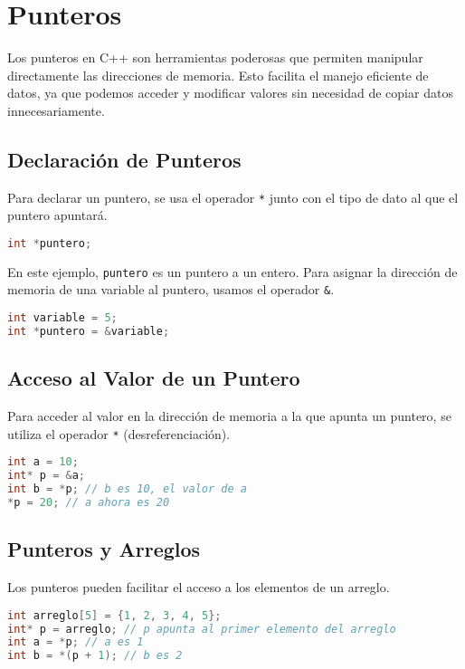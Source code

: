 \section{Punteros}

Los punteros en C++ son herramientas poderosas que permiten manipular directamente las direcciones de memoria. Esto facilita el manejo eficiente de datos, ya que podemos acceder y modificar valores sin necesidad de copiar datos innecesariamente.

\subsection{Declaración de Punteros}

Para declarar un puntero, se usa el operador \texttt{*} junto con el tipo de dato al que el puntero apuntará.

\begin{lstlisting}[language=C++]
int *puntero;
\end{lstlisting}

En este ejemplo, \texttt{puntero} es un puntero a un entero. Para asignar la dirección de memoria de una variable al puntero, usamos el operador \texttt{\&}.

\begin{lstlisting}[language=C++]
int variable = 5;
int *puntero = &variable;
\end{lstlisting}

\subsection{Acceso al Valor de un Puntero}

Para acceder al valor en la dirección de memoria a la que apunta un puntero, se utiliza el operador \texttt{*} (desreferenciación).

\begin{lstlisting}[language=C++]
int a = 10;
int* p = &a;
int b = *p; // b es 10, el valor de a
*p = 20; // a ahora es 20
\end{lstlisting}

\subsection{Punteros y Arreglos}

Los punteros pueden facilitar el acceso a los elementos de un arreglo.

\begin{lstlisting}[language=C++]
int arreglo[5] = {1, 2, 3, 4, 5};
int* p = arreglo; // p apunta al primer elemento del arreglo
int a = *p; // a es 1
int b = *(p + 1); // b es 2
\end{lstlisting}

